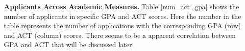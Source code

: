 \documentclass[12pt,english]{report}
\begin{document}

\vspace{0.1in}
\noindent \textbf{Applicants Across Academic Measures.}  Table \ref{num_act_gpa} shows the number of applicants in specific GPA and ACT scores.  Here the number in the table represents the number of applications with the corresponding GPA (row) and ACT (column) scores. There seems to be a apparent correlation between GPA and ACT that will be discussed later. 
\end{document}
